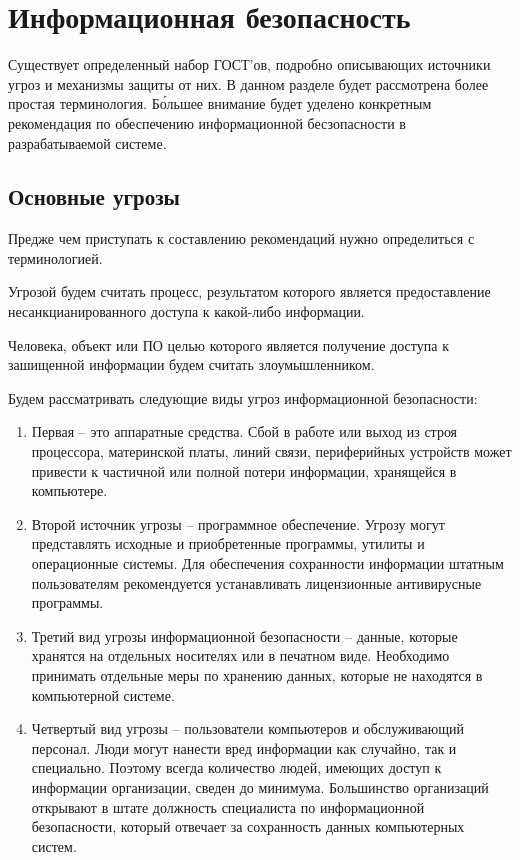 \newpage
\section{Информационная безопасность}
Существует определенный набор ГОСТ’ов, подробно описывающих источники угроз и
механизмы защиты от них. В данном разделе будет рассмотрена более простая
терминология. Б\'{о}льшее внимание будет уделено конкретным рекомендация по
обеспечению информационной бесзопасности в разрабатываемой системе.

\subsection{Основные угрозы}
Предже чем приступать к составлению рекомендаций нужно определиться с
терминологией.

Угрозой будем считать процесс, результатом которого является предоставление
несанкцианированного доступа к какой-либо информации.

Человека, объект или ПО целью которого является получение доступа к зашищенной
информации будем считать злоумышленником.

Будем рассматривать следующие виды угроз информационной безопасности:

\begin{enumerate}
  \item Первая – это аппаратные средства. Сбой в работе или выход из строя процессора, материнской платы, линий связи, периферийных устройств может привести к частичной или полной потери информации, хранящейся в компьютере.
  \item Второй источник угрозы – программное обеспечение. Угрозу могут
представлять исходные и приобретенные программы, утилиты и операционные системы. Для обеспечения сохранности информации штатным пользователям рекомендуется устанавливать лицензионные антивирусные программы.
  \item Третий вид угрозы информационной безопасности – данные, которые хранятся
на отдельных носителях или в печатном виде. Необходимо принимать отдельные меры по хранению данных, которые не находятся в компьютерной системе.
  \item Четвертый вид угрозы – пользователи компьютеров и обслуживающий
персонал. Люди могут нанести вред информации как случайно, так и специально. Поэтому всегда количество людей, имеющих доступ к информации организации, сведен до минимума. Большинство организаций открывают в штате должность специалиста по информационной безопасности, который отвечает за сохранность данных компьютерных систем.
\end{enumerate}

